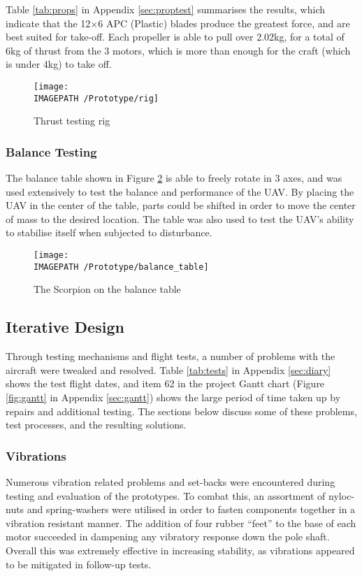 Table \ref{tab:props} in Appendix \ref{sec:proptest} summarises the results, which indicate that the 12$\times$6 APC (Plastic) blades produce the greatest force, and are best suited for take-off. Each propeller is able to pull over 2.02kg, for a total of 6kg of thrust from the 3 motors, which is more than enough for the craft (which is under 4kg) to take off.

\begin{figure}[!ht]
	\centering
	\texttt{[image: \\IMAGEPATH /Prototype/rig]}
	\caption{Thrust testing rig}
	\label{fig:rig}
\end{figure}

\subsubsection*{Balance Testing}
The balance table shown in Figure \ref{fig:balance_table} is able to freely rotate in 3 axes, and was used extensively to test the balance and performance of the UAV. By placing the UAV in the center of the table, parts could be shifted in order to move the center of mass to the desired location. The table was also used to test the UAV's ability to stabilise itself when subjected to disturbance.

\begin{figure}[!ht]
	\centering
	\texttt{[image: \\IMAGEPATH /Prototype/balance\_table]}
	\caption{The Scorpion on the balance table}
	\label{fig:balance_table}
\end{figure}

\subsection{Iterative Design}
Through testing mechanisms and flight tests, a number of problems with the aircraft were tweaked and resolved. Table \ref{tab:tests} in Appendix \ref{sec:diary} shows the test flight dates, and item 62 in the project Gantt chart (Figure \ref{fig:gantt} in Appendix \ref{sec:gantt}) shows the large period of time taken up by repairs and additional testing. The sections below discuss some of these problems, test processes, and the resulting solutions.

\subsubsection*{Vibrations}
Numerous vibration related problems and set-backs were encountered during testing and evaluation of the prototypes. To combat this, an assortment of nyloc-nuts and spring-washers were utilised in order to fasten components together in a vibration resistant manner. The addition of four rubber ``feet'' to the base of each motor succeeded in dampening any vibratory response down the pole shaft. Overall this was extremely effective in increasing stability, as vibrations appeared to be mitigated in follow-up tests.

